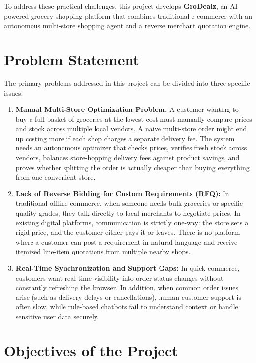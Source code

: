 To address these practical challenges, this project develops \textbf{GroDealz}, an AI-powered grocery shopping platform that combines traditional e-commerce with an autonomous multi-store shopping agent and a reverse merchant quotation engine.

\section{Problem Statement}

The primary problems addressed in this project can be divided into three specific issues:

\begin{enumerate}
    \item \textbf{Manual Multi-Store Optimization Problem:} A customer wanting to buy a full basket of groceries at the lowest cost must manually compare prices and stock across multiple local vendors. A naive multi-store order might end up costing more if each shop charges a separate delivery fee. The system needs an autonomous optimizer that checks prices, verifies fresh stock across vendors, balances store-hopping delivery fees against product savings, and proves whether splitting the order is actually cheaper than buying everything from one convenient store.
    \item \textbf{Lack of Reverse Bidding for Custom Requirements (RFQ):} In traditional offline commerce, when someone needs bulk groceries or specific quality grades, they talk directly to local merchants to negotiate prices. In existing digital platforms, communication is strictly one-way: the store sets a rigid price, and the customer either pays it or leaves. There is no platform where a customer can post a requirement in natural language and receive itemized line-item quotations from multiple nearby shops.
    \item \textbf{Real-Time Synchronization and Support Gaps:} In quick-commerce, customers want real-time visibility into order status changes without constantly refreshing the browser. In addition, when common order issues arise (such as delivery delays or cancellations), human customer support is often slow, while rule-based chatbots fail to understand context or handle sensitive user data securely.
\end{enumerate}

\section{Objectives of the Project}

